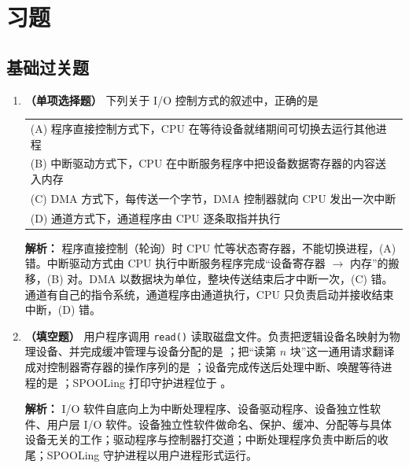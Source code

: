 \section{习题}

\subsection{基础过关题}

\begin{enumerate}

\item \textbf{（单项选择题）} 下列关于 I/O 控制方式的叙述中，正确的是
\begin{center}
\begin{tabular}{l}
(A) 程序直接控制方式下，CPU 在等待设备就绪期间可切换去运行其他进程 \\[4pt]
(B) 中断驱动方式下，CPU 在中断服务程序中把设备数据寄存器的内容送入内存 \\[4pt]
(C) DMA 方式下，每传送一个字节，DMA 控制器就向 CPU 发出一次中断 \\[4pt]
(D) 通道方式下，通道程序由 CPU 逐条取指并执行
\end{tabular}
\end{center}

\ifshowsolutions\par\noindent\textbf{解析：} 程序直接控制（轮询）时 CPU 忙等状态寄存器，不能切换进程，(A) 错。中断驱动方式由 CPU 执行中断服务程序完成“设备寄存器 $\to$ 内存”的搬移，(B) 对。DMA 以数据块为单位，整块传送结束后才中断一次，(C) 错。通道有自己的指令系统，通道程序由通道执行，CPU 只负责启动并接收结束中断，(D) 错。\else \answerarea \fi

\vspace{8pt}

\item \textbf{（填空题）} 用户程序调用 \texttt{read()} 读取磁盘文件。负责把逻辑设备名映射为物理设备、并完成缓冲管理与设备分配的是 \underline{\qquad}；把“读第 $n$ 块”这一通用请求翻译成对控制器寄存器的操作序列的是 \underline{\qquad}；设备完成传送后处理中断、唤醒等待进程的是 \underline{\qquad}；SPOOLing 打印守护进程位于 \underline{\qquad}。

\ifshowsolutions\par\noindent\textbf{解析：} I/O 软件自底向上为中断处理程序、设备驱动程序、设备独立性软件、用户层 I/O 软件。设备独立性软件做命名、保护、缓冲、分配等与具体设备无关的工作；驱动程序与控制器打交道；中断处理程序负责中断后的收尾；SPOOLing 守护进程以用户进程形式运行。\else \answerarea \fi


\end{enumerate}
